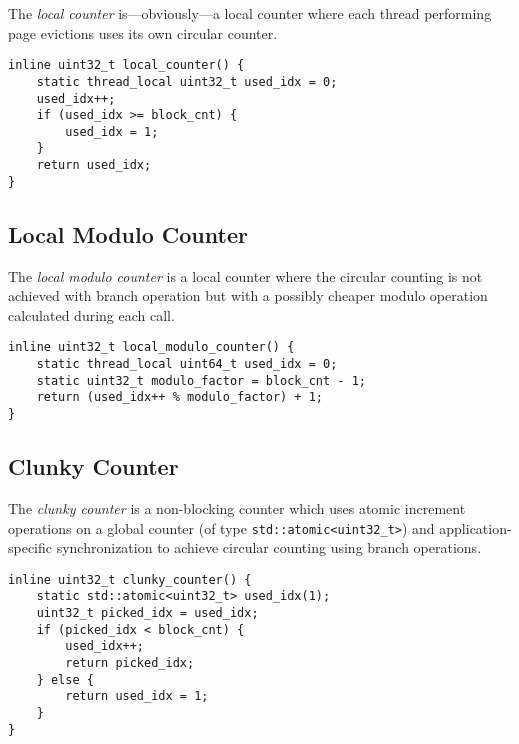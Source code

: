     The \emph{local counter} is---obviously---a local counter where each thread performing page evictions uses its own circular counter.

\begin{@empty}
    \lstset{
        language = [ISO]C++,
        style = basic
    }
    \begin{lstlisting}
inline uint32_t local_counter() {
    static thread_local uint32_t used_idx = 0;
    used_idx++;
    if (used_idx >= block_cnt) {
        used_idx = 1;
    }
    return used_idx;
}
    \end{lstlisting}
\end{@empty}

\subsection[Local Modulo Counter]{Local Modulo Counter} \label{subsec:local_modulo_counter}

    The \emph{local modulo counter} is a local counter where the circular counting is not achieved with branch operation but with a possibly cheaper modulo operation calculated during each call.

\begin{@empty}
    \lstset{
        language = [ISO]C++,
        style = basic
    }
    \begin{lstlisting}
inline uint32_t local_modulo_counter() {
    static thread_local uint64_t used_idx = 0;
    static uint32_t modulo_factor = block_cnt - 1;
    return (used_idx++ % modulo_factor) + 1;
}
    \end{lstlisting}
\end{@empty}

\subsection[Clunky Counter]{Clunky Counter} \label{subsec:clunky_counter}

    The \emph{clunky counter} is a non-blocking counter which uses atomic increment operations on a global counter (of type \lstinline{std::atomic<uint32_t>}) and application-specific synchronization to achieve circular counting using branch operations.

\begin{@empty}
    \lstset{
        language = [ISO]C++,
        style = basic
    }
    \begin{lstlisting}
inline uint32_t clunky_counter() {
    static std::atomic<uint32_t> used_idx(1);
    uint32_t picked_idx = used_idx;
    if (picked_idx < block_cnt) {
        used_idx++;
        return picked_idx;
    } else {
        return used_idx = 1;
    }
}
    \end{lstlisting}
\end{@empty}

